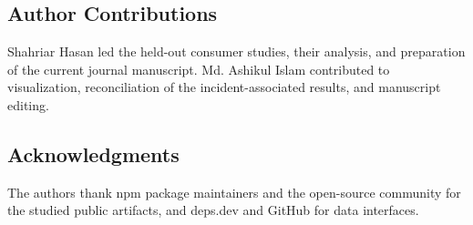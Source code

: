 \documentclass[11pt,a4paper]{article}
\begin{document}
\subsection*{Author Contributions}
Shahriar Hasan led the held-out consumer studies, their analysis, and preparation of the current journal manuscript. Md. Ashikul Islam contributed to visualization, reconciliation of the incident-associated results, and manuscript editing.

\subsection*{Acknowledgments}
The authors thank npm package maintainers and the open-source community for the studied public artifacts, and deps.dev and GitHub for data interfaces.
\end{document}
